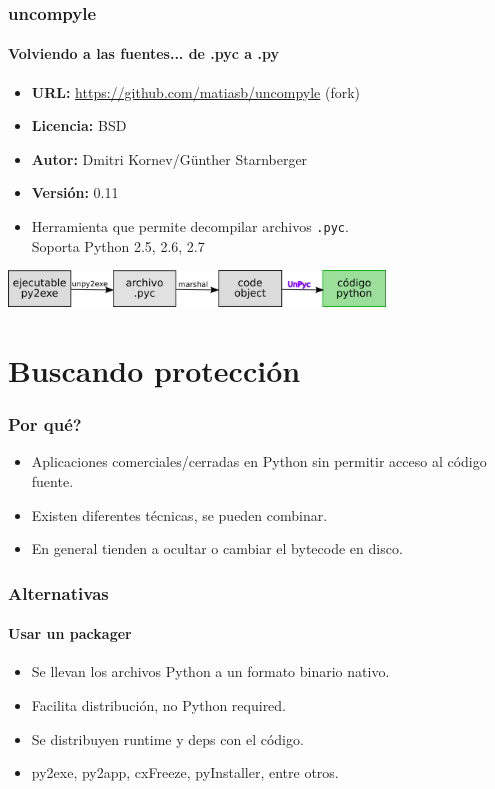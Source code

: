\documentclass[9pt, notes=hide]{beamer}
\begin{document}
    \begin{frame}
        \frametitle{uncompyle}
        \framesubtitle{Volviendo a las fuentes... de .pyc a .py}

        \begin{itemize}
            \item \textbf{URL:} \url{https://github.com/matiasb/uncompyle} (fork)
            \item \textbf{Licencia:} BSD
            \item \textbf{Autor:} Dmitri Kornev/Günther Starnberger
            \item \textbf{Versión:} 0.11
            \item Herramienta que permite decompilar archivos \texttt{.pyc}.\\Soporta Python 2.5, 2.6, 2.7
        \end{itemize}

        \vspace{1cm}
        \begin{center}
            \includegraphics[width=10cm]{images/pipe-4.png}
        \end{center}

    \end{frame}

\section{Buscando protección}

    \begin{frame}
        \frametitle{Por qué?}

        \begin{itemize}
            \item Aplicaciones comerciales/cerradas en Python sin permitir acceso al código fuente.
            \item Existen diferentes técnicas, se pueden combinar.
            \item En general tienden a ocultar o cambiar el bytecode en disco.
        \end{itemize}
    \end{frame}

    \begin{frame}
        \frametitle{Alternativas}
        \framesubtitle{Usar un packager}

        \begin{itemize}
            \item Se llevan los archivos Python a un formato binario nativo.
            \item Facilita distribución, no Python required.
            \item Se distribuyen runtime y deps con el código.
            \item py2exe, py2app, cxFreeze, pyInstaller, entre otros.
        \end{itemize}
    \end{frame}
\end{document}
